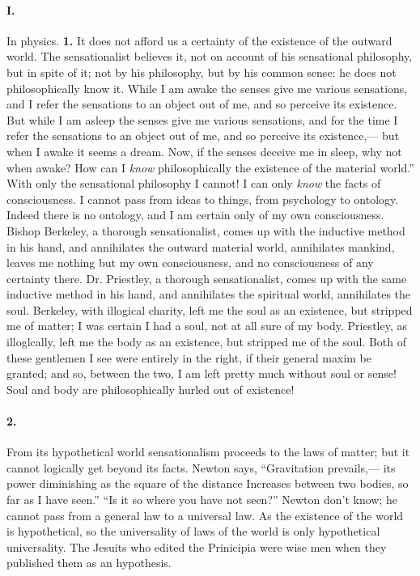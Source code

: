 \documentclass[12pt]{article}
\begin{document}
\paragraph{I.} In physics. \textbf{1.} It does not afford us a certainty of the existence of the outward world. The sensationalist believes it, not on account of his sensational philosophy, but in spite of it; not by his philosophy, but by his common sense: he does not philosophically know it. While I am awake the senses give me various sensations, and I refer the sensations to an object out of me, and so perceive its existence. But while I am asleep the senses give me various sensations, and for the time I refer the sensations to an object out of me, and so perceive its existence,--- but when I awake it seems a dream. Now, if the senses deceive me in sleep, why not when awake? How can I \emph{know} philosophically the existence of the material world.'' With only the sensational philosophy I cannot! I can only \emph{know} the facts of consciousness. I cannot pass from ideas to things, from psychology to ontology. Indeed there is no ontology, and I am certain only of my own consciousness. Bishop Berkeley, a thorough sensationalist, comes up with the inductive method in his hand, and annihilates the outward material world, annihilates mankind, leaves me nothing but my own consciousness, and no consciousness of any certainty there. Dr. Priestley, a thorough sensationalist, comes up with the same inductive method in his hand, and annihilates the spiritual world, annihilates the soul. Berkeley, with illogical charity, left me the soul as an existence, but stripped me of matter; I was certain I had a soul, not at all sure of my body. Priestley, as illoglcally, left me the body as an existence, but stripped me of the soul. Both of these gentlemen I see were entirely in the right, if their general maxim be granted; and so, between the two, I am left pretty much without soul or sense! Soul and body are philosophically hurled out of existence! 

\paragraph{2.} From its hypothetical world sensationalism proceeds to the laws of matter; but it cannot logically get beyond its facts. Newton says, ``Gravitation prevails,--- its power diminishing as the square of the distance Increases between two bodies, so far as I have seen.'' ``Is it so where you have not seen?'' Newton don't know; he cannot pass from a general law to a universal law. As the existence of the world is hypothetical, so the universality of laws of the world is only hypothetical universality. The Jesuits who edited the Prinicipia were wise men when they published them as an hypothesis.
\end{document}
